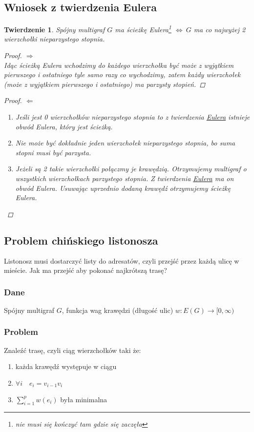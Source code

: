 \documentclass[12pt,a4paper]{article}
\newtheorem{tw}{Twierdzenie}
\theoremstyle{definition}
\begin{document}
\subsection{Wniosek z twierdzenia Eulera}
\begin{tw}
Spójny multigraf $G$ ma ścieżkę Eulera\footnote{nie musi się kończyć tam gdzie się zaczęła} $\Leftrightarrow~ G$ ma co najwyżej 2 wierzchołki nieparzystego stopnia.
\begin{proof}
$\Rightarrow$\\
Idąc ścieżką Eulera wchodzimy do każdego wierzchołka być może z wyjątkiem pierwszego i ostatniego tyle samo razy co wychodzimy, zatem każdy wierzchołek (może z wyjątkiem pierwszego i ostatniego) ma parzysty stopień.
\end{proof} 
\begin{proof}
$\Leftarrow$
	\begin{enumerate}
		\item Jeśli jest 0 wierzchołków nieparzystego stopnia to z twierdzenia \hyperref[tw:Eulera]{Eulera} istnieje obwód Eulera, który jest ścieżką.
		\item Nie może być dokładnie jeden wierzchołek nieparzystego stopnia, bo suma stopni musi być parzysta.
		\item Jeżeli są 2 takie wierzchołki połączmy je krawędzią. Otrzymujemy multigraf o wszystkich wierzchołkach parzystego stopnia. Z twierdzenia \hyperref[tw:Eulera]{Eulera} ma on obwód Eulera. Usuwając uprzednio dodaną krawędź otrzymujemy ścieżkę  Eulera.
	\end{enumerate}
\end{proof}
\end{tw}

\subsection{Problem chińskiego listonosza}
Listonosz musi dostarczyć listy do adresatów, czyli przejść przez każdą ulicę w mieście. Jak ma przejść aby pokonać najkrótszą trasę?\\
\subsubsection{Dane} Spójny multigraf $G$, funkcja wag krawędzi (długość ulic) $w : E(G) \to [0,\infty)$\\
\subsubsection{Problem} Znaleźć trasę, czyli ciąg wierzchołków taki że:
\begin{enumerate}
	\item każda krawędź występuje w ciągu
	\item $\forall i \quad e_i = v_{i-1}v_i$
	\item $\sum\limits_{i=1}^{p} w(e_i)$ była minimalna 
\end{enumerate}
\end{document}
